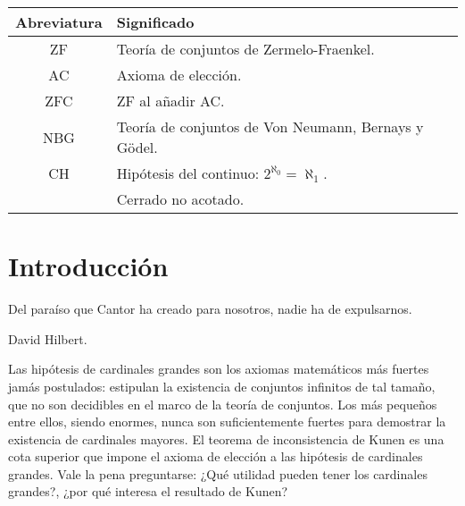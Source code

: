 \begin{center}
    \begin{tabular}{cl}
        Abreviatura & Significado \\
        \hline\noalign{\smallskip}
        ZF & Teoría de conjuntos de Zermelo-Fraenkel.\\
        AC & Axioma de elección.\\
        ZFC & ZF al añadir AC.\\
        NBG & Teoría de conjuntos de Von Neumann, Bernays y Gödel.\\
        CH & Hipótesis del continuo: $2^{\aleph_0} = \aleph_1$. \\
        \cna{} & Cerrado no acotado. \\
    \end{tabular}
\end{center}
\fi
\iftoc \ToC \fi
\ifintro
\chapter*{Introducción}

\epigraph
{
Del paraíso que Cantor ha creado para nosotros, nadie ha de expulsarnos.
}
{David Hilbert. \autocite[pág 170]{hilbert_uber_1926}}

Las hipótesis de cardinales grandes son los axiomas matemáticos
más fuertes jamás postulados: estipulan la existencia de conjuntos
infinitos de tal tamaño, que no son decidibles en el marco de la teoría de conjuntos.
Los más pequeños entre ellos, siendo enormes, nunca son suficientemente
fuertes para demostrar la existencia de cardinales mayores.
El teorema de inconsistencia de Kunen es
una cota superior que impone el axioma de elección a las
hipótesis de cardinales grandes.
Vale la pena preguntarse: ¿Qué utilidad pueden tener los cardinales grandes?,
¿por qué interesa el resultado de Kunen?

